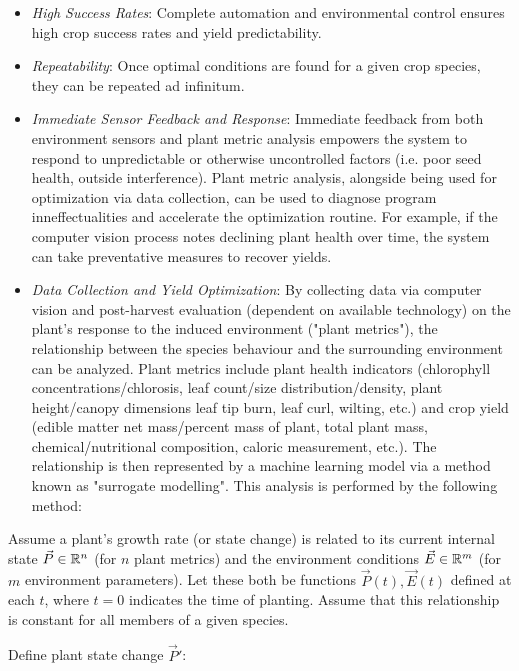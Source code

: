 \documentclass{report}
\begin{document}
\begin{itemize}
    \item \textit{High Success Rates}: Complete automation and environmental control ensures high crop success rates and yield predictability.
    \item \textit{Repeatability}: Once optimal conditions are found for a given crop species, they can be repeated ad infinitum.
    \item \textit{Immediate Sensor Feedback and Response}: Immediate feedback from both environment sensors and plant metric analysis empowers the system to respond to unpredictable or otherwise uncontrolled factors (i.e. poor seed health, outside interference). Plant metric analysis, alongside being used for optimization via data collection, can be used to diagnose program inneffectualities and accelerate the optimization routine. For example, if the computer vision process notes declining plant health over time, the system can take preventative measures to recover yields.
    \item \textit{Data Collection and Yield Optimization}: By collecting data via computer vision and post-harvest evaluation (dependent on available technology) on the plant's response to the induced environment ("plant metrics"), the relationship between the species behaviour and the surrounding environment can be analyzed. Plant metrics include plant health indicators (chlorophyll concentrations/chlorosis, leaf count/size distribution/density, plant height/canopy dimensions leaf tip burn, leaf curl, wilting, etc.) and crop yield (edible matter net mass/percent mass of plant, total plant mass, chemical/nutritional composition, caloric measurement, etc.). The relationship is then represented by a machine learning model via a method known as "surrogate modelling". This analysis is performed by the following method:
    
\end{itemize}

\newpage

Assume a plant's growth rate (or state change) is related to its current internal state $\vec P \in \mathbb R^n$ (for $n$ plant metrics) and the environment conditions $\vec E \in \mathbb R^m$ (for $m$ environment parameters). Let these both be functions $\vec P (t),\vec E(t)$ defined at each $t$, where $t=0$ indicates the time of planting. Assume that this relationship is constant for all members of a given species.

Define plant state change $\vec P'$: 
\end{document}
